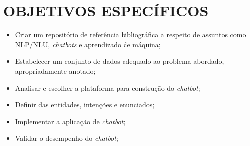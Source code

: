 \section{OBJETIVOS ESPECÍFICOS}
\label{sec:objetivos_especificos}

\begin{itemize}
    \item Criar um repositório de referência bibliográfica a respeito de assuntos como NLP/NLU, \textit{chatbots} e aprendizado de máquina;
    \item Estabelecer um conjunto de dados adequado ao problema abordado, apropriadamente anotado;
    \item Analisar e escolher a plataforma para construção do \textit{chatbot};
    \item Definir das entidades, intenções e enunciados;
    \item Implementar a aplicação de \textit{chatbot};
    \item Validar o desempenho do \textit{chatbot};
\end{itemize}
